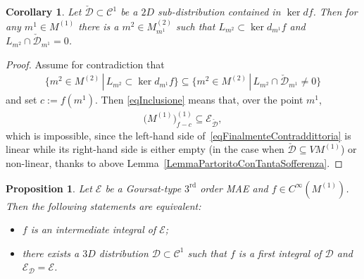 \documentclass[pdftex]{sigma}
\newcommand{\C}{\mathcal{C}}
\newcommand{\D}{\mathcal{D}}
\newcommand{\E}{\mathcal{E}}
\newcommand{\Rd}{^\textrm{rd}}
\newcommand{\Ddue}{{\check{\mathcal{D}}}}
\numberwithin{equation}{section}
\newtheorem{Corollary}[Theorem]{Corollary}
\newtheorem{Proposition}[Theorem]{Proposition}
 { \theoremstyle{definition}
\newtheorem{Definition}[Theorem]{Definition}
\newtheorem{Example}[Theorem]{Example}
\newtheorem{Remark}[Theorem]{Remark} }
\begin{document}
\begin{Corollary}\label{corollarioUnPoPesante}
 Let $\Ddue\subset\C^1$ be a $2D$ sub-distribution contained in $\ker d f$. Then for any \mbox{$m^1\in M^{(1)}$} there is a $m^2\in M^{(2)}_{m^1}$ such that $L_{m^2}\subset \ker d_{m^1}f$ and $L_{m^2}\cap \Ddue_{m^1}=0$.
\end{Corollary}

\begin{proof}
 Assume for contradiction that
 \begin{gather}\label{eqInclusione}
\big\{m^2\in M^{(2)}\,|\, L_{m^2}\subset \ker d_{m^1}f\big\}\subseteq \big\{m^2\in M^{(2)}\,|\, L_{m^2}\cap \Ddue_{m^1}\neq 0\big\}
\end{gather}
and set $c:=f(m^1)$. Then \eqref{eqInclusione} means that, over the point $m^1$,
 \begin{gather}\label{eqFinalmenteContraddittoria}
 \big(M^{(1)}\big)_{f-c}^{(1)}\subseteq \E_\Ddue ,
\end{gather}
which is impossible, since the left-hand side of~\eqref{eqFinalmenteContraddittoria} is linear while its right-hand side is either empty (in the case when $\Ddue\subseteq VM^{(1)}$) or non-linear, thanks to above Lemma~\ref{LemmaPartoritoConTantaSofferenza}.
\end{proof}

\begin{Proposition}\label{propIntInt}
 Let $\E$ be a Goursat-type $3\Rd$ order MAE and $f\in C^\infty(M^{(1)})$. Then
 the following statements are equivalent:
 \begin{itemize}\itemsep=0pt
 \item $f$ is an intermediate integral of $\E$;
\item there exists a $3D$ distribution $\D\subset\C^1$ such that $f$ is a first integral of $\D$ and $\E_\D=\E$.
\end{itemize}
\end{Proposition}
\end{document}
